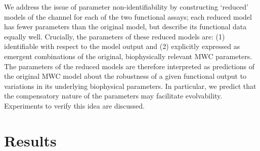 \documentclass[10pt]{amsart}
\newcommand\ca{\rm{Ca}^{2+}}
\newcommand\kk{\rm{K}^+}
\begin{document}
We address the issue of parameter non-identifiability by constructing `reduced' models of the channel for each of the two functional assays; each reduced model has fewer parameters than the original model, but describe its functional data equally well.  Crucially, the parameters of these reduced models are: (1) identifiable with respect to the model output and (2) explicitly expressed as emergent combinations of the original, biophysically relevant MWC parameters.  The parameters of the reduced models are therefore interpreted as predictions of the original MWC model about the robustness of a given functional output to variations in its underlying biophysical parameters.  In particular, we predict that the compensatory nature of the parameters may facilitate evolvability.  Experiments to verify this idea are discussed.


\section{Results}

\end{document}
